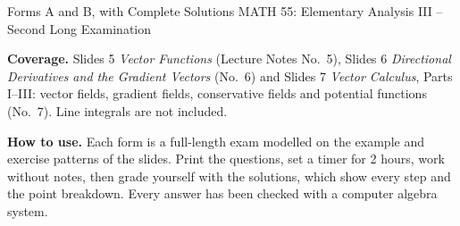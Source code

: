 \documentclass[11pt,a4paper]{article}
\begin{document}

  {Forms A and B, with Complete Solutions}
  {MATH 55: Elementary Analysis III -- Second Long Examination}
  {\textbf{Coverage.} Slides 5 \emph{Vector Functions} (Lecture Notes
   No.~5), Slides 6 \emph{Directional Derivatives and the Gradient Vectors}
   (No.~6) and Slides 7 \emph{Vector Calculus}, Parts I--III: vector fields,
   gradient fields, conservative fields and potential functions (No.~7).
   Line integrals are not included.\par\medskip
   \textbf{How to use.} Each form is a full-length exam modelled on the
   example and exercise patterns of the slides. Print the questions, set a
   timer for 2 hours, work without notes, then grade yourself with the
   solutions, which show every step and the point breakdown. Every answer has
   been checked with a computer algebra system.}

\tableofcontents
\clearpage
{}






\end{document}
